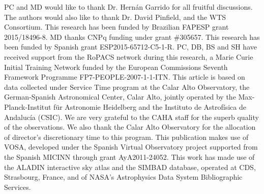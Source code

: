 \documentclass[fleqn,usenatbib]{mnras}
\begin{document}
PC and MD would like to thank Dr. Hern\'an Garrido for all fruitful discussions. The authors would also like to thank Dr. David Pinfield, and the WTS Consortium. 
This research has been funded by Brazilian FAPESP grant 2015/18496-8. MD thanks CNPq funding under grant \#305657. This research has been funded by Spanish grant ESP2015-65712-C5-1-R.
PC, DB, BS and SH have received support from the RoPACS network during this research, a Marie Curie Initial Training Network funded by the European Commissions Seventh Framework Programme FP7-PEOPLE-2007-1-1-ITN. 
This article is based on data collected under Service Time program at the Calar Alto Observatory, the German-Spanish Astronomical Center, Calar Alto, jointly operated by the Max-Planck-Institut f\"ur Astronomie Heidelberg and the Instituto de Astrof\'isica de Andaluc\'ia (CSIC). We are very grateful to the CAHA staff for the superb quality of the observations. We also thank the Calar Alto Observatory for the allocation of director's discretionary time to this program. 
This publication makes use of VOSA, developed under the Spanish Virtual Observatory project supported from the Spanish MICINN through grant AyA2011-24052. This work has made use of the ALADIN interactive sky atlas and the SIMBAD database, operated at CDS, Strasbourg, France, and of NASA's Astrophysics Data System Bibliographic Services. %






%
\end{document}
